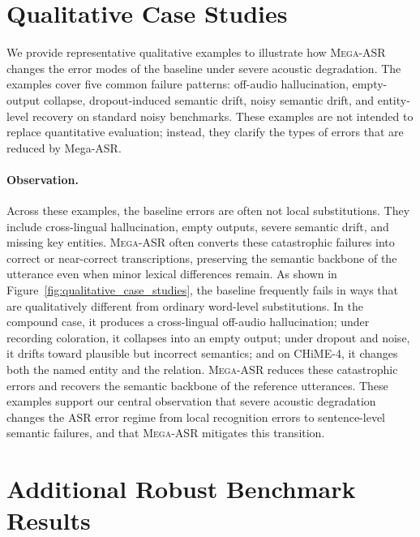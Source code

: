 \documentclass{llmxive}
\begin{document}



\appendix


\section{Qualitative Case Studies}

We provide representative qualitative examples to illustrate how \textsc{Mega-ASR} changes
the error modes of the baseline under severe acoustic degradation. The examples
cover five common failure patterns: off-audio hallucination, empty-output
collapse, dropout-induced semantic drift, noisy semantic drift, and entity-level
recovery on standard noisy benchmarks. These examples are not intended to
replace quantitative evaluation; instead, they clarify the types of errors that
are reduced by Mega-ASR.

\paragraph{Observation.}
Across these examples, the baseline errors are often not local substitutions.
They include cross-lingual hallucination, empty outputs, severe semantic drift,
and missing key entities. \textsc{Mega-ASR} often converts these catastrophic failures
into correct or near-correct transcriptions, preserving the semantic backbone of
the utterance even when minor lexical differences remain.
As shown in Figure~\ref{fig:qualitative_case_studies}, the baseline frequently
fails in ways that are qualitatively different from ordinary word-level
substitutions. In the compound case, it produces a cross-lingual off-audio
hallucination; under recording coloration, it collapses into an empty output;
under dropout and noise, it drifts toward plausible but incorrect semantics; and
on CHiME-4, it changes both the named entity and the relation. \textsc{Mega-ASR} reduces
these catastrophic errors and recovers the semantic backbone of the reference
utterances. These examples support our central observation that severe acoustic
degradation changes the ASR error regime from local recognition errors to
sentence-level semantic failures, and that \textsc{Mega-ASR} mitigates this transition.


\section{Additional Robust Benchmark Results}
\label{app:additional_robust_results}
\end{document}
